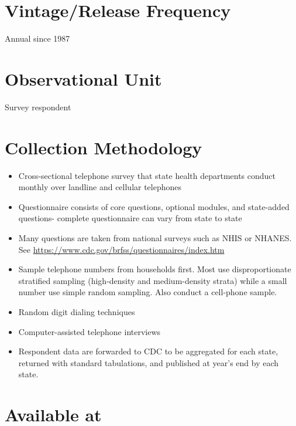 \documentclass[
]{book}
\providecommand{\tightlist}{%
  \setlength{\itemsep}{0pt}\setlength{\parskip}{0pt}}
\begin{document}
\hypertarget{vintagerelease-frequency-11}{%
\section{Vintage/Release Frequency}\label{vintagerelease-frequency-11}}

Annual since 1987

\hypertarget{observational-unit-11}{%
\section{Observational Unit}\label{observational-unit-11}}

Survey respondent

\hypertarget{collection-methodology-11}{%
\section{Collection Methodology}\label{collection-methodology-11}}

\begin{itemize}
\tightlist
\item
  Cross-sectional telephone survey that state health departments conduct monthly over landline and cellular telephones
\item
  Questionnaire consists of core questions, optional modules, and state-added questions- complete questionnaire can vary from state to state
\item
  Many questions are taken from national surveys such as NHIS or NHANES. See \url{https://www.cdc.gov/brfss/questionnaires/index.htm}
\item
  Sample telephone numbers from households first. Most use disproportionate stratified sampling (high-density and medium-density strata) while a small number use simple random sampling. Also conduct a cell-phone sample.
\item
  Random digit dialing techniques
\item
  Computer-assisted telephone interviews
\item
  Respondent data are forwarded to CDC to be aggregated for each state, returned with standard tabulations, and published at year's end by each state.
\end{itemize}

\hypertarget{available-at-11}{%
\section{Available at}\label{available-at-11}}
\end{document}
